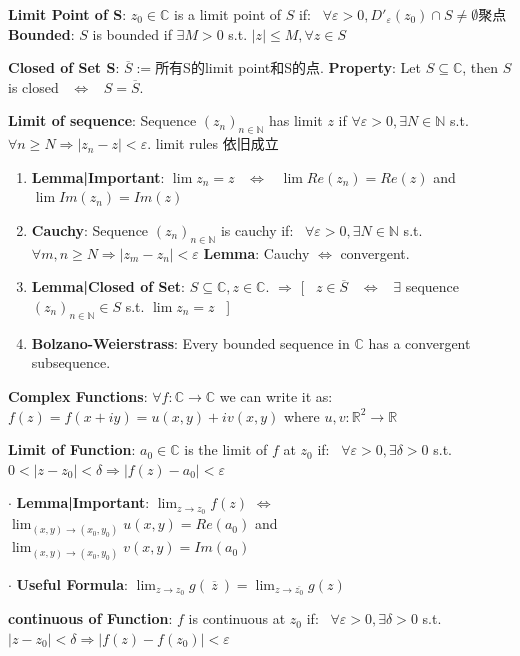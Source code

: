 \documentclass[9pt]{article}
\begin{document}
\textbf{Limit Point of S}: $z_0\in\mathbb{C}$ is a limit point of $S$ if: \ $\forall\varepsilon>0,D'_\varepsilon(z_0)\cap S\neq\emptyset${\tiny 聚点} \quad \quad \textbf{Bounded}: $S$ is bounded if $\exists M>0$ s.t. $|z|\leq M,\forall z\in S$

\textbf{Closed of Set S}: $\overline{S}:=$所有S的limit point和S的点. \quad \textbf{Property}: Let $S\subseteq\mathbb{C}$, then $S$ is closed \ $\Leftrightarrow$ \ $S=\overline{S}$.

\textbf{Limit of sequence}: Sequence $(z_n)_{n\in\mathbb{N}}$ has limit $z$ if $\forall\varepsilon>0,\exists N\in\mathbb{N}$ s.t. $\forall n\geq N\Rightarrow |z_n-z|<\varepsilon$. {\scriptsize limit rules 依旧成立}

\begin{enumerate}[itemsep=-2pt, topsep=-2pt]
    \item \textbf{Lemma|Important}: $\lim z_n=z$ \ $\Leftrightarrow$ \ $\lim Re(z_n)=Re(z)$ and $\lim Im(z_n)=Im(z)$
    \item \textbf{Cauchy}: Sequence $(z_n)_{n\in\mathbb{N}}$ is cauchy if: \ $\forall\varepsilon>0,\exists N\in\mathbb{N}$ s.t. $\forall m,n\geq N\Rightarrow |z_m-z_n|<\varepsilon$ \quad \textbf{Lemma}: Cauchy $\Leftrightarrow$ convergent.
    \item \textbf{Lemma|Closed of Set}: $S\subseteq\mathbb{C},z\in\mathbb{C}$. $\Rightarrow$ [ \ $z\in\overline{S}$ \ $\Leftrightarrow$ \ $\exists$ sequence $(z_n)_{n\in\mathbb{N}}\in S$ s.t. $\lim z_n=z$ \ ]
    \item \textbf{Bolzano-Weierstrass}: Every bounded sequence in $\mathbb{C}$ has a convergent subsequence.
\end{enumerate}

\textbf{Complex Functions}: $\forall f:\mathbb{C}\to\mathbb{C}$ we can write it as: $f(z)=f(x+iy)=u(x,y)+iv(x,y)$ where $u,v:\mathbb{R}^2\to\mathbb{R}$

\textbf{Limit of Function}: $a_0\in\mathbb{C}$ is the limit of $f$ at $z_0$ if: \ $\forall\varepsilon>0,\exists\delta>0$ s.t. $0<|z-z_0|<\delta\Rightarrow |f(z)-a_0|<\varepsilon$ 

$\cdot$ \textbf{Lemma|Important}: $\lim_{z\to z_0} f(z)$ $\Leftrightarrow$ $\lim_{(x,y)\to(x_0,y_0)} u(x,y)=Re(a_0)$ and $\lim_{(x,y)\to(x_0,y_0)} v(x,y)=Im(a_0)$

$\cdot$ \textbf{Useful Formula}: $\lim_{z\to z_0}g(\ \overline{z} \ )=\lim_{z\to\overline{z_0}}g(z)$

\textbf{continuous of Function}: $f$ is continuous at $z_0$ if: \ $\forall\varepsilon>0,\exists\delta>0$ s.t. $|z-z_0|<\delta\Rightarrow |f(z)-f(z_0)|<\varepsilon$ 
\end{document}
